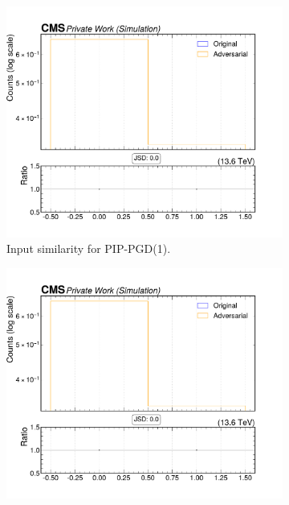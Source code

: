 \begin{figure}[htbp]
  \centering
  \begin{subfigure}[t]{0.32\textwidth}
    \includegraphics[width=\linewidth]{media/output/features/compare/combined_it_1/cmp_cpf_arr_Cpfcan_puppiw.pdf}
    \caption*{Input similarity for PIP-PGD(1).}
  \end{subfigure}\hfill
  \begin{subfigure}[t]{0.32\textwidth}
    \includegraphics[width=\linewidth]{media/output/features/compare/combined_it_2/cmp_cpf_arr_Cpfcan_puppiw.pdf}

\end{subfigure}
\end{figure}
